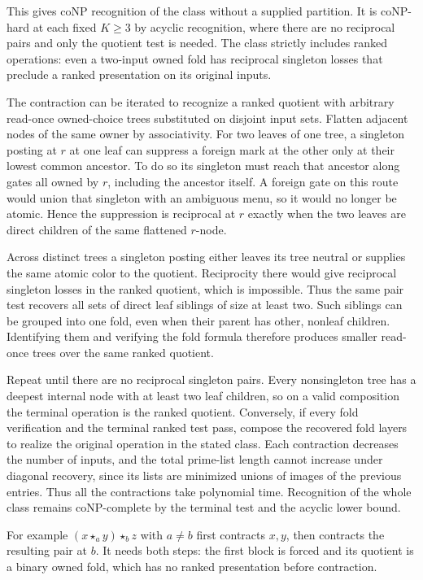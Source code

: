This gives coNP recognition of the class without a
supplied partition. It is coNP-hard at each fixed
$K\ge3$ by acyclic recognition, where there are no
reciprocal pairs and only the quotient test is needed.
The class strictly includes ranked operations:
even a two-input owned fold has reciprocal singleton
losses that preclude a ranked presentation on its
original inputs.

The contraction can be iterated to recognize a ranked
quotient with arbitrary read-once owned-choice trees
substituted on disjoint input sets. Flatten adjacent
nodes of the same owner by associativity. For two
leaves of one tree, a singleton posting at $r$ at
one leaf can suppress a foreign mark at the other
only at their lowest common ancestor. To do so its
singleton must reach that ancestor along gates all
owned by $r$, including the ancestor itself. A
foreign gate on this route would union that singleton
with an ambiguous menu, so it would no longer be
atomic. Hence the suppression is reciprocal at $r$
exactly when the two leaves are direct children of
the same flattened $r$-node.

Across distinct trees a singleton posting either
leaves its tree neutral or supplies the same atomic
color to the quotient. Reciprocity there would give
reciprocal singleton losses in the ranked quotient,
which is impossible. Thus the same pair test recovers
all sets of direct leaf siblings of size at least
two. Such siblings can be grouped into one fold,
even when their parent has other, nonleaf children.
Identifying them and verifying the fold formula
therefore produces smaller read-once trees over
the same ranked quotient.

Repeat until there are no reciprocal singleton
pairs. Every nonsingleton tree has a deepest
internal node with at least two leaf children, so
on a valid composition the terminal operation is
the ranked quotient. Conversely, if every fold
verification and the terminal ranked test pass,
compose the recovered fold layers to realize the
original operation in the stated class. Each
contraction decreases the number of inputs, and
the total prime-list length cannot increase under
diagonal recovery, since its lists are minimized
unions of images of the previous entries. Thus all
the contractions take polynomial time. Recognition
of the whole class remains coNP-complete by the
terminal test and the acyclic lower bound.

For example $(x\star_a y)\star_b z$ with $a\ne b$
first contracts $x,y$, then contracts the resulting
pair at $b$. It needs both steps: the first block
is forced and its quotient is a binary owned fold,
which has no ranked presentation before contraction.

